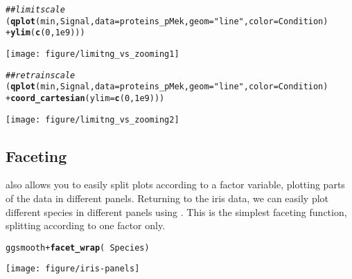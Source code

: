 \documentclass{article}\usepackage[]{graphicx}\usepackage[usenames,dvipsnames]{color}
\makeatletter
\def\maxwidth{ %
  \ifdim\Gin@nat@width>\linewidth
    \linewidth
  \else
    \Gin@nat@width
  \fi
}
\newcommand{\hlnum}[1]{\textcolor[rgb]{0.686,0.059,0.569}{#1}}%
\newcommand{\hlstr}[1]{\textcolor[rgb]{0.192,0.494,0.8}{#1}}%
\newcommand{\hlcom}[1]{\textcolor[rgb]{0.678,0.584,0.686}{\textit{#1}}}%
\newcommand{\hlopt}[1]{\textcolor[rgb]{0,0,0}{#1}}%
\newcommand{\hlstd}[1]{\textcolor[rgb]{0.345,0.345,0.345}{#1}}%
\newcommand{\hlkwc}[1]{\textcolor[rgb]{0.333,0.667,0.333}{#1}}%
\newcommand{\hlkwd}[1]{\textcolor[rgb]{0.737,0.353,0.396}{\textbf{#1}}}%
\newenvironment{kframe}{%
 \def\at@end@of@kframe{}%
 \ifinner\ifhmode%
  \def\at@end@of@kframe{\end{minipage}}%
  \begin{minipage}{\columnwidth}%
 \fi\fi%
 \def\FrameCommand##1{\hskip\@totalleftmargin \hskip-\fboxsep
 \colorbox{shadecolor}{##1}\hskip-\fboxsep
     \hskip-\linewidth \hskip-\@totalleftmargin \hskip\columnwidth}%
 \MakeFramed {\advance\hsize-\width
   \@totalleftmargin\z@ \linewidth\hsize
   \@setminipage}}%
 {\par\unskip\endMakeFramed%
 \at@end@of@kframe}
\newenvironment{knitrout}{}{} %
\makeatother
\begin{document}
\begin{knitrout}
\color{fgcolor}\begin{kframe}
\begin{alltt}
\hlcom{## limit scale}
\hlstd{(}\hlkwd{qplot}\hlstd{(min, Signal,} \hlkwc{data} \hlstd{= proteins_pMek,} \hlkwc{geom} \hlstd{=} \hlstr{"line"}\hlstd{,} \hlkwc{color} \hlstd{= Condition)}
\hlopt{+} \hlkwd{ylim}\hlstd{(}\hlkwd{c}\hlstd{(}\hlnum{0}\hlstd{,}\hlnum{1e9}\hlstd{)))}
\end{alltt}


{\ttfamily\noindent\color{warningcolor}{\#>\ \  Warning: Removed 4 rows containing missing values (geom\_path).}}\end{kframe}
\texttt{[image: figure/limitng\_vs\_zooming1]} 
\begin{kframe}\begin{alltt}
\hlcom{## retrain scale}
\hlstd{(}\hlkwd{qplot}\hlstd{(min, Signal,} \hlkwc{data} \hlstd{= proteins_pMek,} \hlkwc{geom} \hlstd{=} \hlstr{"line"}\hlstd{,} \hlkwc{color} \hlstd{= Condition)}
\hlopt{+} \hlkwd{coord_cartesian}\hlstd{(}\hlkwc{ylim} \hlstd{=} \hlkwd{c}\hlstd{(}\hlnum{0}\hlstd{,} \hlnum{1e9}\hlstd{)))}
\end{alltt}
\end{kframe}
\texttt{[image: figure/limitng\_vs\_zooming2]} 

\end{knitrout}

\subsection{Faceting}

 also allows you to easily split plots according to a factor 
variable, plotting parts of the data in different panels. Returning
to the iris data, we can easily plot different species in different 
panels using . This is
the simplest faceting function, splitting according to one
factor only. 


\begin{knitrout}
\color{fgcolor}\begin{kframe}
\begin{alltt}
\hlstd{ggsmooth} \hlopt{+} \hlkwd{facet_wrap}\hlstd{(} \hlopt{~} \hlstd{Species)}
\end{alltt}
\end{kframe}
\texttt{[image: figure/iris-panels]} 

\end{knitrout}
\end{document}
